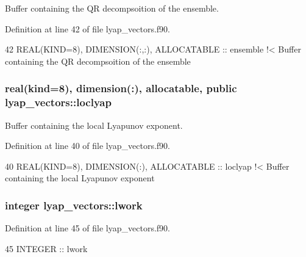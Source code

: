 Buffer containing the QR decompsoition of the ensemble. 



Definition at line 42 of file lyap\+\_\+vectors.\+f90.


\begin{DoxyCode}
42   \textcolor{keywordtype}{REAL(KIND=8)}, \textcolor{keywordtype}{DIMENSION(:,:)}, \textcolor{keywordtype}{ALLOCATABLE} :: ensemble\textcolor{comment}{ !< Buffer containing the QR decompsoition of the
       ensemble}
\end{DoxyCode}
\subsubsection[{\texorpdfstring{loclyap}{loclyap}}]{\setlength{\rightskip}{0pt plus 5cm}real(kind=8), dimension(\+:), allocatable, public lyap\+\_\+vectors\+::loclyap}\hypertarget{namespacelyap__vectors_a85e15a0071ac9c6857316d72152be731}{}\label{namespacelyap__vectors_a85e15a0071ac9c6857316d72152be731}


Buffer containing the local Lyapunov exponent. 



Definition at line 40 of file lyap\+\_\+vectors.\+f90.


\begin{DoxyCode}
40   \textcolor{keywordtype}{REAL(KIND=8)}, \textcolor{keywordtype}{DIMENSION(:)}, \textcolor{keywordtype}{ALLOCATABLE} :: loclyap\textcolor{comment}{    !< Buffer containing the local Lyapunov exponent}
\end{DoxyCode}
\subsubsection[{\texorpdfstring{lwork}{lwork}}]{\setlength{\rightskip}{0pt plus 5cm}integer lyap\+\_\+vectors\+::lwork\hspace{0.3cm}{\ttfamily [private]}}\hypertarget{namespacelyap__vectors_a217e531a819065ea8ebc1548ca82d5e1}{}\label{namespacelyap__vectors_a217e531a819065ea8ebc1548ca82d5e1}


Definition at line 45 of file lyap\+\_\+vectors.\+f90.


\begin{DoxyCode}
45   \textcolor{keywordtype}{INTEGER} :: lwork
\end{DoxyCode}
